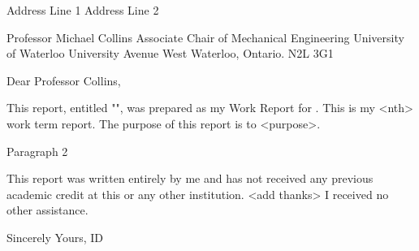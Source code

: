 {
\noindent
Address Line 1\newline
Address Line 2\newline
\dateofsubmittal

\noindent
Professor Michael Collins\newline %
Associate Chair of Mechanical Engineering\newline %
\department\newline
University of Waterloo University Avenue West\newline
Waterloo, Ontario. N2L 3G1

\noindent
Dear Professor Collins, %

\noindent
This report, entitled "\reporttitle", was prepared as my \academicterm Work Report for \yourorganization. This is my <nth> work term report. The purpose of this report is to <purpose>. %

\noindent
Paragraph 2

\noindent
This report was written entirely by me and has not received any previous academic credit at this or any other institution. <add thanks> I received no other assistance. %

\noindent Sincerely Yours,\bigbreak\bigbreak\bigbreak\bigbreak %
\noindent\yourname\newline
ID \youridnumber
\par}

